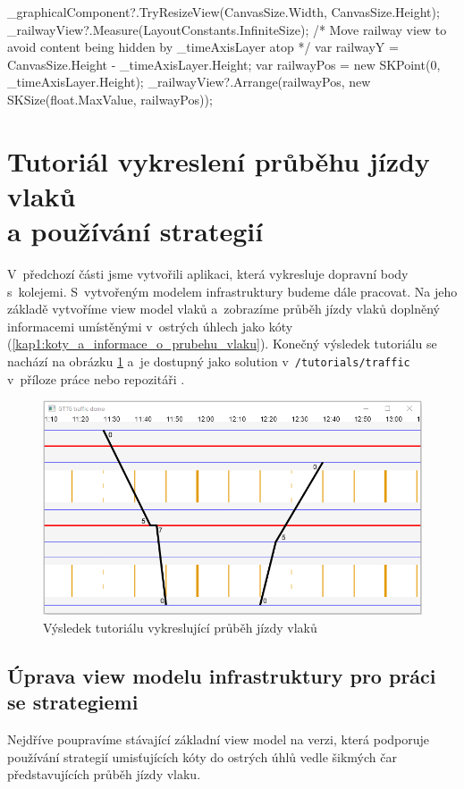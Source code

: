 \begin{csharpcode}

_graphicalComponent?.TryResizeView(CanvasSize.Width, CanvasSize.Height);
_railwayView?.Measure(LayoutConstants.InfiniteSize);
/* Move railway view to avoid content being hidden by _timeAxisLayer atop */
var railwayY = CanvasSize.Height - _timeAxisLayer.Height;
var railwayPos = new SKPoint(0, _timeAxisLayer.Height);
_railwayView?.Arrange(railwayPos, new SKSize(float.MaxValue, railwayPos));
\end{csharpcode}

\newpage
\section[Tutoriál vykreslení průběhu jízdy vlaků a~používání strategií]{Tutoriál vykreslení průběhu jízdy vlaků \\a používání strategií}
V~předchozí části jsme vytvořili aplikaci, která vykresluje dopravní body s~kolejemi. S~vytvořeným modelem infrastruktury budeme dále pracovat. Na jeho základě vytvoříme view model vlaků a~zobrazíme průběh jízdy vlaků doplněný informacemi umístěnými v~ostrých úhlech jako kóty (\ref{kap1:koty_a_informace_o_prubehu_vlaku}).
Konečný výsledek tutoriálu se nachází na obrázku \ref{fig:kap5:traffic_demo} a~je dostupný jako solution v~\texttt{/tutorials/traffic} v~příloze práce nebo repozitáři \cite{GTTG.Tutorials.Traffic}.

\begin{figure}[!hbt]
	\centering
	\includegraphics[width=.8\textwidth]{../img/kap5_gttg_traffic_demo}
	\caption{Výsledek tutoriálu vykreslující průběh jízdy vlaků}
	\label{fig:kap5:traffic_demo}
\end{figure}

\subsection*{Úprava view modelu infrastruktury pro práci se strategiemi}
Nejdříve poupravíme stávající základní view model na verzi, která podporuje používání strategií umisťujících kóty do ostrých úhlů vedle šikmých čar představujících průběh jízdy vlaku.

